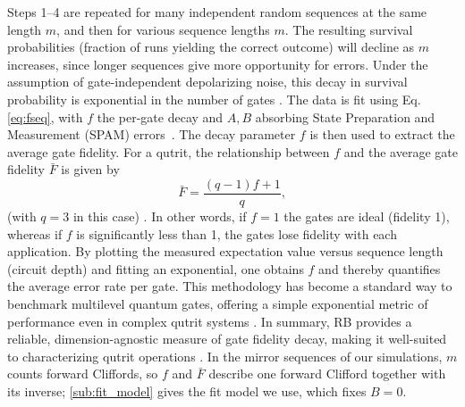 Steps 1–4 are repeated for many independent random sequences at the same length $m$, and then for various sequence lengths $m$. The resulting survival probabilities (fraction of runs yielding the correct outcome) will decline as $m$ increases, since longer sequences give more opportunity for errors. Under the assumption of gate-independent depolarizing noise, this decay in survival probability is exponential in the number of gates \cite{Magesan2011PRL}. The data is fit using Eq.\eqref{eq:fseq}, with $f$ the per-gate decay and $A,B$ absorbing State Preparation and Measurement (SPAM) errors~\cite{Magesan2011PRL,Magesan2012PRA}.
 The decay parameter $f$ is then used to extract the average gate fidelity. For a qutrit, the relationship between $f$ and the average gate fidelity $\bar{F}$ is given by
\begin{equation}
\bar{F} = \frac{(q-1)f + 1}{q},
\label{eq:fbar}
\end{equation}
(with $q=3$ in this case) \cite{Nielsen2002,Magesan2012PRA}. In other words, if $f=1$ the gates are ideal (fidelity 1), whereas if $f$ is significantly less than 1, the gates lose fidelity with each application. By plotting the measured expectation value versus sequence length (circuit depth) and fitting an exponential, one obtains $f$ and thereby quantifies the average error rate per gate. This methodology has become a standard way to benchmark multilevel quantum gates, offering a simple exponential metric of performance even in complex qutrit systems \cite{Morvan2021,Proctor2019DRB}. In summary, RB provides a reliable, dimension-agnostic measure of gate fidelity decay, making it well-suited to characterizing qutrit operations \cite{Magesan2011PRL,Magesan2012PRA}. In the mirror sequences of our simulations, $m$ counts forward Cliffords, so $f$ and $\bar F$ describe one forward Clifford together with its inverse; \autoref{sub:fit_model} gives the fit model we use, which fixes $B=0$.